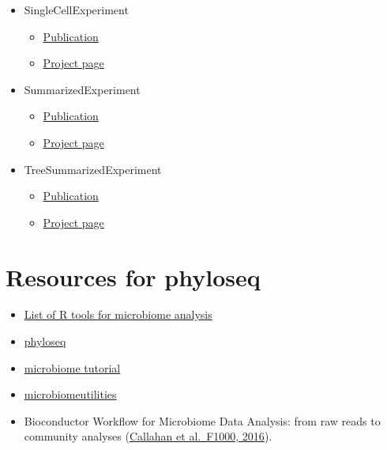 \documentclass[
  oneside]{book}
\providecommand{\tightlist}{%
  \setlength{\itemsep}{0pt}\setlength{\parskip}{0pt}}
\begin{document}
\begin{itemize}
\tightlist
\item
  SingleCellExperiment

  \begin{itemize}
  \tightlist
  \item
    \href{https://bioconductor.org/packages/release/bioc/vignettes/SingleCellExperiment/inst/doc/intro.html}{Publication}
  \item
    \href{https://bioconductor.org/packages/release/bioc/html/SingleCellExperiment.html}{Project page}
  \end{itemize}
\item
  SummarizedExperiment

  \begin{itemize}
  \tightlist
  \item
    \href{https://bioconductor.org/packages/release/bioc/vignettes/SummarizedExperiment/inst/doc/SummarizedExperiment.html}{Publication}
  \item
    \href{https://bioconductor.org/packages/release/bioc/html/SummarizedExperiment.html}{Project page}
  \end{itemize}
\item
  TreeSummarizedExperiment

  \begin{itemize}
  \tightlist
  \item
    \href{https://f1000research.com/articles/9-1246}{Publication}
  \item
    \href{https://www.bioconductor.org/packages/release/bioc/html/TreeSummarizedExperiment.html}{Project page}
  \end{itemize}
\end{itemize}

\hypertarget{resources-for-phyloseq}{%
\section{Resources for phyloseq}\label{resources-for-phyloseq}}

\begin{itemize}
\tightlist
\item
  \href{https://microsud.github.io/Tools-Microbiome-Analysis/}{List of R tools for microbiome analysis}
\item
  \href{http://journals.plos.org/plosone/article?id=10.1371/journal.pone.0061217}{phyloseq}
\item
  \href{http://microbiome.github.io/tutorials/}{microbiome tutorial}
\item
  \href{https://microsud.github.io/microbiomeutilities/}{microbiomeutilities}
\item
  Bioconductor Workflow for Microbiome Data Analysis: from raw reads to community analyses (\href{https://f1000research.com/articles/5-1492/v2}{Callahan et al.~F1000, 2016}).
\end{itemize}
\end{document}
